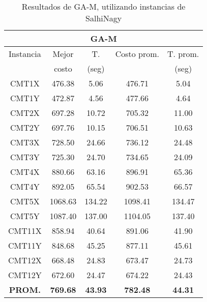 \begin{minipage}[h]{0.45\linewidth}
\begin{table}[H]
\scriptsize 
\caption{ Resultados de GA-M, utilizando instancias de SalhiNagy }
\centering
\begin{tabular}{|c||c c c c|}
\hline
\multicolumn{5}{|c|}{\bf{GA-M}}\\\hline
Instancia & Mejor & T. & Costo prom. & T. prom.\\
& costo & (seg) & & (seg)\\ [0.5ex]
\hline\hline
CMT1X & 476.38 & 5.06 & 476.71 & 5.04\\
CMT1Y & 472.87 & 4.56 & 477.66 & 4.64\\
CMT2X & 697.28 & 10.72 & 705.32 & 11.00\\
CMT2Y & 697.76 & 10.15 & 706.51 & 10.63\\
CMT3X & 728.50 & 24.66 & 736.12 & 24.48\\
CMT3Y & 725.30 & 24.70 & 734.65 & 24.09\\
CMT4X & 880.66 & 63.16 & 896.91 & 65.36\\
CMT4Y & 892.05 & 65.54 & 902.53 & 66.57\\
CMT5X & 1068.63 & 134.22 & 1098.41 & 134.47\\
CMT5Y & 1087.40 & 137.00 & 1104.05 & 137.40\\
CMT11X & 858.94 & 40.64 & 891.06 & 41.90\\
CMT11Y & 848.68 & 45.25 & 877.11 & 45.61\\
CMT12X & 668.48 & 24.83 & 673.47 & 24.73\\
CMT12Y & 672.60 & 24.47 & 674.22 & 24.43\\\hline\hline\bf{PROM.} & 
\bf{769.68} & \bf{43.93} & \bf{782.48} & \bf{44.31}\\[1ex]\hline
\end{tabular}
\label{apendice-table:finalS-IGA}
\end{table}
\end{minipage}